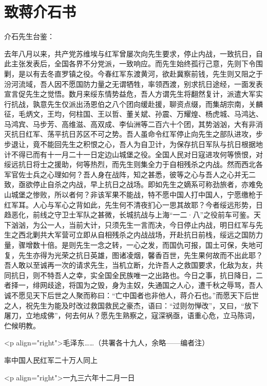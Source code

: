 \section[致蒋介石书（一九三六年十二月一日）]{致蒋介石书}


介石先生台鉴：

去年八月以来，共产党苏维埃与红军曾屡次向先生要求，停止内战，一致抗日，自此主张发表后，全国各界不分党派，一致响应。而先生始终孤行己意，先则下令围剿，是以有去冬直罗镇之役。今春红军东渡黄河，欲赴冀察前钱，先生则又阻之于汾河流域，吾人因不愿国防力量之无谓牺牲，率领西渡，别求抗日途经，一面发表宣言促先生之觉悟。数月来绥东情势益危，吾人方谓先生将翻然复计，派遣大军实行抗战，孰意先生仅派出汤恩伯之八个团向缓赴援，聊资点缀，而集胡宗南，关麟征，毛炳文，王均，何柱国、王以哲、董关斌、孙震、万耀煌、杨虎城、马鸿达、马鸿宾、马步芳、高维滋、高双成、李仙洲等二百六十个团，其势汹汹，大有非消灭抗日红军、荡平抗日苏区不可之势。吾人虽命令红军停止向先生之部队进攻，步步退让，竟不能回先生之积恨之心，吾人为自卫计，为保存抗日军队与抗日根据地计不得已而有十一月二十一日定边山城堡之役。全国人民对日寇进攻何等愤恨，对绥远抗日将士之援助，何等热烈，而先生则集全力于自相残杀之内战。然而西北各军官佐士兵之心理如何？吾人身在战阵，知之甚悉，彼等之心与吾人之心并无二致，亟欲停止自杀之内战，早上抗日之战场。即如先生之嫡系可称劲旅者，亦难免山城堡之惨败，所以者何？非该军果不能战，特不愿中国人打中国人，宁愿缴枪于红军耳。人心与军心之背如此，先生何不清夜扪心一思其故耶？今者绥远形势，日趋恶化，前线之守卫士军队之甚微，长城抗战与上海“一二·八”之役前车可鉴。天下汹汹，为公一人，当前大计，只须先生一言而决，今日停止内战，明日红军与先生之西北剿共大军营可立即从自相残杀之内战战场，开赴抗日前栈，绥远之国防力量，骤增数十倍。是则先生一念之转，一心之发，而国仇可报，国土可保，失地可复，先生亦得为光荣之抗日英雄，图诸凌烟，馨香百世，先生果何故而不出此耶？吾人敢以至诚再一次的请求先生，当机立断，允许吾人之救国要求，化敌为友，共同抗日，则不特吾人之幸，实全国全民族唯一之出路也。今日之事，抗日降日，二者择一，绯网歧途，将国为之毁，身为主奴，失通国之人心，遭千秋之辱骂，吾人诚不愿见天下后世之人聚而称曰：“亡中国者也非他人，蒋介石也。”而愿天下后世之人，祝先生为能及时改过救国救民之豪杰，语曰：“过则勿惮改”，又曰，“放下屠刀，立地成佛”，何去何从？愿先生熟察之，寇深祸亟，语重心危，立马陈词，伫候明教。

<p align="right">毛泽东……（共署各十九人，余略——编者注）

 率中国人民红军二十万人同上

<p align="right">一九三六年十二月一日




